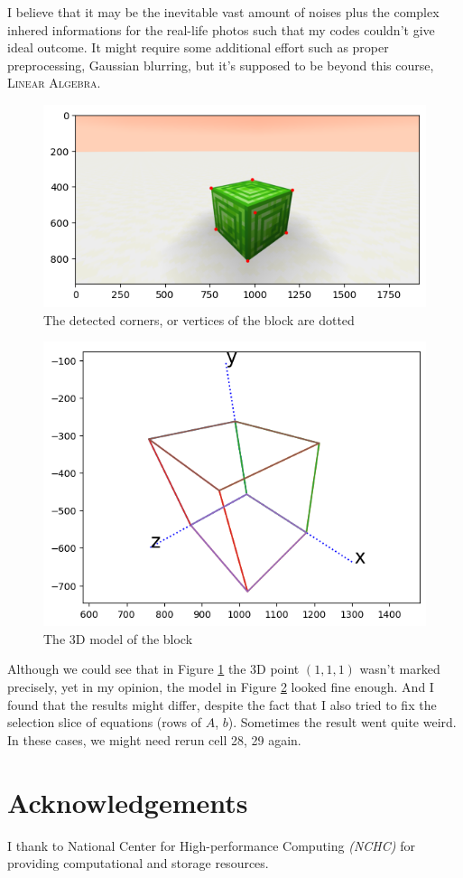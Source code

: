 \documentclass[12pt, a4paper]{article}
\begin{document}
I believe that it may be the inevitable vast amount of noises plus the complex inhered informations for the real-life photos such that my codes couldn't give ideal outcome. It might require some additional effort such as proper preprocessing, Gaussian blurring, but it's supposed to be beyond this course, \textsc{Linear Algebra}.

\begin{figure}[htbp]
\centering
\includegraphics[width=\linewidth]{block_corners}
\caption{The detected corners, or vertices of the block are dotted}
\label{fig:block_corners}
\end{figure}

\begin{figure}[htbp]
\centering
\includegraphics[width=\linewidth]{block_model}
\caption{The 3D model of the block}
\label{fig:block_model}
\end{figure}

Although we could see that in Figure \ref{fig:block_corners} the 3D point $(1,1,1)$ wasn't marked precisely, yet in my opinion, the model in Figure \ref{fig:block_model} looked fine enough. And I found that the results might differ, despite the fact that I also tried to fix the selection slice of equations (rows of $A$, $b$). Sometimes the result went quite weird. In these cases, we might need rerun cell 28, 29 again.

\pagebreak

\section*{Acknowledgements}

I thank to \textsf{National Center for High-performance Computing} \textit{(NCHC)} for providing computational and storage resources.

\nocite{*}
\printbibliography
\end{document}
